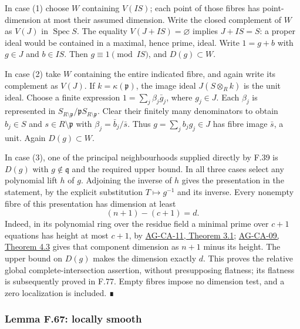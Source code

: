 \documentclass[11pt,a4paper,openany]{report}
\newcounter{none}
\begin{document}
In case (1) choose \(W\) containing \(V(IS)\); each point of those fibres has point-dimension at most their assumed dimension. Write the closed complement of \(W\) as \(V(J)\) in \(\operatorname{Spec}S\). The equality \(V(J+IS)=\varnothing\) implies \(J+IS=S\): a proper ideal would be contained in a maximal, hence prime, ideal. Write \(1=g+b\) with \(g\in J\) and \(b\in IS\). Then \(g\equiv1\pmod{IS}\), and \(D(g)\subset W\).

In case (2) take \(W\) containing the entire indicated fibre, and again write its complement as \(V(J)\). If \(k=\kappa(\mathfrak p)\), the image ideal \(J(S\otimes_R k)\) is the unit ideal. Choose a finite expression \(1=\sum_j\beta_j\bar g_j\), where \(g_j\in J\). Each \(\beta_j\) is represented in \(S_{R\setminus\mathfrak p}/\mathfrak pS_{R\setminus\mathfrak p}\). Clear their finitely many denominators to obtain \(b_j\in S\) and \(s\in R\setminus\mathfrak p\) with \(\beta_j=\bar b_j/\bar s\). Thus \(g=\sum_j b_jg_j\in J\) has fibre image \(\bar s\), a unit. Again \(D(g)\subset W\).

In case (3), one of the principal neighbourhoods supplied directly by F.39 is \(D(g)\) with \(g\notin\mathfrak q\) and the required upper bound. In all three cases select any polynomial lift \(h\) of \(g\). Adjoining the inverse of \(h\) gives the presentation in the statement, by the explicit substitution \(T\mapsto g^{-1}\) and its inverse. Every nonempty fibre of this presentation has dimension at least \[ (n+1)-(c+1)=d.\] Indeed, in its polynomial ring over the residue field a minimal prime over \(c+1\) equations has height at most \(c+1\), by \href{https://github.com/KokunoYumeto/open-math-courses/blob/d02d0a3669f42579db037cd44de1d113fdd770a1/docs/courses/AG-CA/src/dimension-theory-of-noetherian-local-rings.md}{AG-CA-11, Theorem 3.1}; \href{https://github.com/KokunoYumeto/open-math-courses/blob/d02d0a3669f42579db037cd44de1d113fdd770a1/docs/courses/AG-CA/src/krull-dimension-and-noether-normalization.md}{AG-CA-09, Theorem 4.3} gives that component dimension as \(n+1\) minus its height. The upper bound on \(D(g)\) makes the dimension exactly \(d\). This proves the relative global complete-intersection assertion, without presupposing flatness; its flatness is subsequently proved in F.77. Empty fibres impose no dimension test, and a zero localization is included. ∎

\label{AG-RG-S05-algebra-lemma-locally-smooth}

\subsubsection{Lemma F.67: locally smooth}\label{AG-RG-S05-lemma-f.67-locally-smooth}
\end{document}
